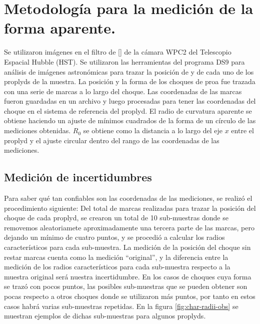 \section{Metodología para la medición de la forma aparente.}
\label{sec:methodology}
Se utilizaron imágenes en el filtro de [] de la cámara WPC2 del Telescopio Espacial Hubble (HST). Se utilizaron las herramientas del programa DS9 para análisis de imágenes astronómicas para trazar la posición de \thC{} y de cada uno de los proplyds de la muestra. La posición y la forma de los choques de proa fue trazada con una serie de marcas a lo largo del choque. Las coordenadas de las marcas fueron guardadas en un archivo y luego procesadas para tener las coordenadas del choque en el sistema de referencia del proplyd. El radio de curvatura aparente se obtiene haciendo un ajuste de mínimos cuadrados de la forma de un círculo de las mediciones obtenidas. $R_0$ se obtiene como la distancia a lo largo del eje $x$ entre el proplyd y el ajuste circular dentro del rango de las coordenadas de las mediciones. 

\subsection{Medición de incertidumbres}

Para saber qué tan confiables son las coordenadas de las mediciones, se realizó el procedimiento siguiente: Del total de marcas realizadas para trazar la posición del choque de cada proplyd, se crearon un total de 10 sub-muestras donde se removemos aleatoriamete aproximadamente una tercera parte de las marcas, pero dejando un mínimo de cuatro puntos, y se procedió a calcular los radios característicos para cada sub-muestra. La medición de la posición del choque sin restar marcas cuenta como la medición ``original'', y la diferencia entre la medición de los radios característicos para cada sub-muestra respecto a la muestra original será nuestra incertidumbre. En los casos de choques cuya forma se trazó con pocos puntos, las posibles sub-muestras que se pueden obtener son pocas respecto a otros choques donde se utilizaron más puntos, por tanto en estos casos habrá varias sub-muestras repetidas. En la figura \ref{fig:char-radii-obs} se muestran ejemplos de dichas sub-muestras para algunos proplyds.


